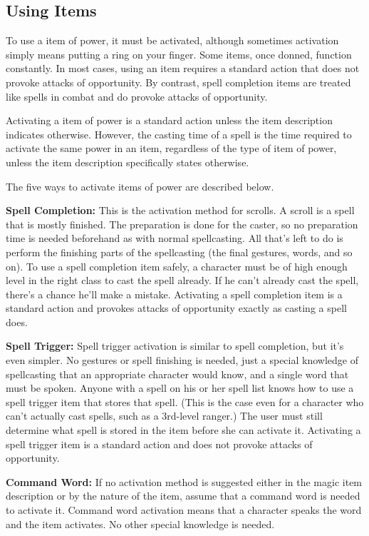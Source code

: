 \subsection{Using Items}
To use a item of power, it must be activated, although sometimes activation simply means putting a ring on your finger. Some items, once donned, function constantly. In most cases, using an item requires a standard action that does not provoke attacks of opportunity. By contrast, spell completion items are treated like spells in combat and do provoke attacks of opportunity.

Activating a item of power is a standard action unless the item description indicates otherwise. However, the casting time of a spell is the time required to activate the same power in an item, regardless of the type of item of power, unless the item description specifically states otherwise.

The five ways to activate items of power are described below.

\textbf{Spell Completion:} This is the activation method for scrolls. A scroll is a spell that is mostly finished. The preparation is done for the caster, so no preparation time is needed beforehand as with normal spellcasting. All that's left to do is perform the finishing parts of the spellcasting (the final gestures, words, and so on). To use a spell completion item safely, a character must be of high enough level in the right class to cast the spell already. If he can't already cast the spell, there's a chance he'll make a mistake. Activating a spell completion item is a standard action and provokes attacks of opportunity exactly as casting a spell does.

\textbf{Spell Trigger:} Spell trigger activation is similar to spell completion, but it's even simpler. No gestures or spell finishing is needed, just a special knowledge of spellcasting that an appropriate character would know, and a single word that must be spoken. Anyone with a spell on his or her spell list knows how to use a spell trigger item that stores that spell. (This is the case even for a character who can't actually cast spells, such as a 3rd-level ranger.) The user must still determine what spell is stored in the item before she can activate it. Activating a spell trigger item is a standard action and does not provoke attacks of opportunity.

\textbf{Command Word:} If no activation method is suggested either in the magic item description or by the nature of the item, assume that a command word is needed to activate it. Command word activation means that a character speaks the word and the item activates. No other special knowledge is needed.

